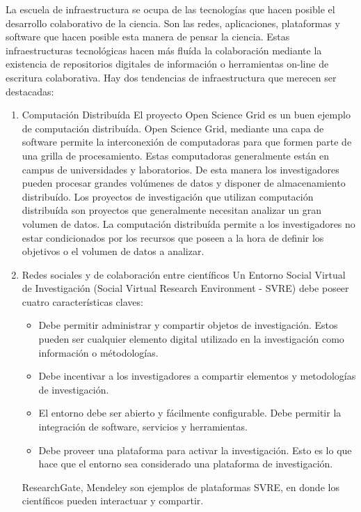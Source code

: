 \begin{itemize}
		La escuela de infraestructura se ocupa de las tecnologías que hacen posible el desarrollo colaborativo de la ciencia. Son las redes, aplicaciones, plataformas y software que hacen posible esta manera de pensar la ciencia. Estas infraestructuras tecnológicas hacen más fluída la colaboración mediante la existencia de repositorios digitales de información o herramientas on-line de escritura colaborativa. Hay dos tendencias de infraestructura que merecen ser destacadas:
		\begin{enumerate}
			\item {Computación Distribuída}
			El proyecto Open Science Grid es un buen ejemplo de computación distribuída. Open Science Grid, mediante una capa de software permite la interconexión de computadoras para que  formen parte de una grilla de procesamiento. Estas computadoras generalmente están en campus de universidades y laboratorios. De esta manera los investigadores pueden procesar grandes volúmenes de datos y disponer de almacenamiento distribuído. Los proyectos de investigación que utilizan computación distribuída son proyectos que generalmente necesitan analizar un gran volumen de datos. La computación distribuída permite a los investigadores no estar condicionados por los recursos que poseen a la hora de definir los objetivos o el volumen de datos a analizar.
			\item {Redes sociales y de colaboración entre científicos}
			Un Entorno Social Virtual de Investigación (Social Virtual Research Environment - SVRE) debe poseer cuatro características claves:
			\begin{itemize}
				\item Debe permitir administrar y compartir objetos de investigación. Estos pueden ser cualquier elemento digital utilizado en la investigación como información o métodologías.
				\item Debe incentivar a los investigadores a compartir elementos y metodologías de investigación.
				\item El entorno debe ser abierto y fácilmente configurable. Debe permitir la integración de software, servicios y herramientas.
				\item Debe proveer una plataforma para activar la investigación. Esto es lo que hace que el entorno sea considerado una plataforma de investigación.				
			\end{itemize}	
			ResearchGate, Mendeley son ejemplos de plataformas SVRE, en donde los científicos pueden interactuar y compartir.
		\end{enumerate}
		

\end{itemize}
